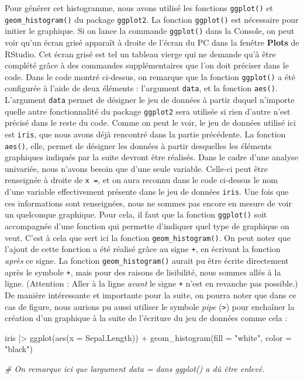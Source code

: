 \documentclass[
]{book}
\newenvironment{Shaded}{\begin{snugshade}}{\end{snugshade}}
\newcommand{\AttributeTok}[1]{\textcolor[rgb]{0.77,0.63,0.00}{#1}}
\newcommand{\CommentTok}[1]{\textcolor[rgb]{0.56,0.35,0.01}{\textit{#1}}}
\newcommand{\FunctionTok}[1]{\textcolor[rgb]{0.00,0.00,0.00}{#1}}
\newcommand{\NormalTok}[1]{#1}
\newcommand{\SpecialCharTok}[1]{\textcolor[rgb]{0.00,0.00,0.00}{#1}}
\newcommand{\StringTok}[1]{\textcolor[rgb]{0.31,0.60,0.02}{#1}}
\begin{document}
Pour générer cet histogramme, nous avons utilisé les fonctions \texttt{ggplot()} et \texttt{geom\_histogram()} du package \texttt{ggplot2}. La fonction \texttt{ggplot()} est nécessaire pour initier le graphique. Si on lance la commande \texttt{ggplot()} dans la Console, on peut voir qu'un écran grisé apparaît à droite de l'écran du PC dans la fenêtre \textbf{Plots} de RStudio. Cet écran grisé est tel un tableau vierge qui ne demande qu'à être complété grâce à des commandes supplémentaires que l'on doit préciser dans le code. Dans le code montré ci-dessus, on remarque que la fonction \texttt{ggplot()} a été configurée à l'aide de deux éléments : l'argument \texttt{data}, et la fonction \texttt{aes()}. L'argument \texttt{data} permet de désigner le jeu de données à partir duquel n'importe quelle autre fonctionnalité du package \texttt{ggplot2} sera utilisée si rien d'autre n'est précisé dans le reste du code. Comme on peut le voir, le jeu de données utilisé ici est \texttt{iris}, que nous avons déjà rencontré dans la partie précédente. La fonction \texttt{aes()}, elle, permet de désigner les données à partir desquelles les éléments graphiques indiqués par la suite devront être réalisés. Dans le cadre d'une analyse univariée, nous n'avons besoin que d'une seule variable. Celle-ci peut être renseignée à droite de \texttt{x\ =}, et on aura reconnu dans le code ci-dessus le nom d'une variable effectivement présente dans le jeu de données \texttt{iris}. Une fois que ces informations sont renseignées, nous ne sommes pas encore en mesure de voir un quelconque graphique. Pour cela, il faut que la fonction \texttt{ggplot()} soit accompagnée d'une fonction qui permette d'indiquer quel type de graphique on veut. C'est à cela que sert ici la fonction \texttt{geom\_histogram()}. On peut noter que l'ajout de cette fonction a été réalisé grâce au signe \texttt{+}, en écrivant la fonction \emph{après} ce signe. La fonction \texttt{geom\_histogram()} aurait pu être écrite directement après le symbole \texttt{+}, mais pour des raisons de lisibilité, nous sommes allés à la ligne. (Attention : Aller à la ligne \emph{avant} le signe \texttt{+} n'est en revanche pas possible.) De manière intéressante et importante pour la suite, on pourra noter que dans ce cas de figure, nous aurions pu aussi utiliser le symbole \emph{pipe} (\texttt{\textbar{}\textgreater{}}) pour enchaîner la création d'un graphique à la suite de l'écriture du jeu de données comme cela :

\begin{Shaded}
\begin{Highlighting}[]
\NormalTok{iris }\SpecialCharTok{|\textgreater{}}
  \FunctionTok{ggplot}\NormalTok{(}\FunctionTok{aes}\NormalTok{(}\AttributeTok{x =}\NormalTok{ Sepal.Length)) }\SpecialCharTok{+}
  \FunctionTok{geom\_histogram}\NormalTok{(}\AttributeTok{fill =} \StringTok{"white"}\NormalTok{, }\AttributeTok{color =} \StringTok{"black"}\NormalTok{)}

\CommentTok{\# On remarque ici que l\textquotesingle{}argument \textasciigrave{}data = \textasciigrave{} dans \textasciigrave{}ggplot()\textasciigrave{} a dû être enlevé.}
\end{Highlighting}
\end{Shaded}
\end{document}
